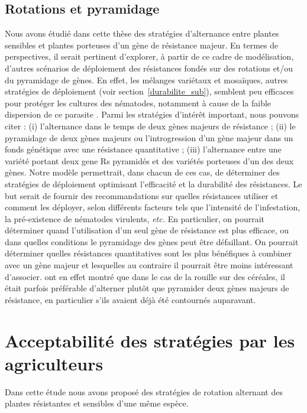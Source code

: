 \subsection{Rotations et pyramidage}
	
	Nous avons étudié dans cette thèse des stratégies d'alternance entre plantes sensibles et plantes porteuses d'un gène de résistance majeur. En termes de perspectives, il serait pertinent d’explorer, à partir de ce cadre de modélisation, d'autres scénarios de déploiement des résistances fondés sur des rotations et/ou du pyramidage de gènes. En effet, les mélanges variétaux et mosaïques, autres stratégies de déploiement (voir section~\ref{durabilite_sub}), semblent peu efficaces pour protéger les cultures des nématodes, notamment à cause de la faible dispersion de ce parasite \citep{Djian-Caporalino2014}.
Parmi les stratégies d'intérêt important, nous pouvons citer : (i) l'alternance dans le temps de deux gènes majeurs de résistance ; (ii) le pyramidage de deux gènes majeurs ou l'introgression d'un gène majeur dans un fonds génétique avec une résistance quantitative ; (iii) l'alternance entre une variété portant deux \glspl{gene R} pyramidés et des variétés porteuses d'un des deux gènes. Notre modèle permettrait, dans chacun de ces cas, de déterminer des stratégies de déploiement optimisant l'efficacité et la durabilité des résistances. Le but serait de fournir des recommandations sur quelles résistances utiliser et comment les déployer, selon différents facteurs tels que l'intensité de l'infestation, la pré-existence de nématodes virulents, \textit{etc.} En particulier, on pourrait déterminer quand l’utilisation d’un seul gène de résistance est plus efficace, ou dans quelles conditions le pyramidage des gènes
peut être défaillant.  On pourrait déterminer quelles résistances quantitatives sont les plus
bénéfiques à combiner avec un gène majeur et lesquelles au contraire il pourrait être moins intéressant d’associer.
\citet{Rimbaud2018a} ont en effet montré que dans le cas de la rouille sur des céréales, il était parfois préférable d’alterner plutôt que pyramider deux gènes majeurs de résistance, en particulier s'ils avaient déjà été contournés auparavant.
	
\section{Acceptabilité des stratégies par les agriculteurs}
	
	Dans cette étude nous avons proposé des stratégies  de rotation  alternant des plantes résistantes et sensibles d'une même espèce.  
	
